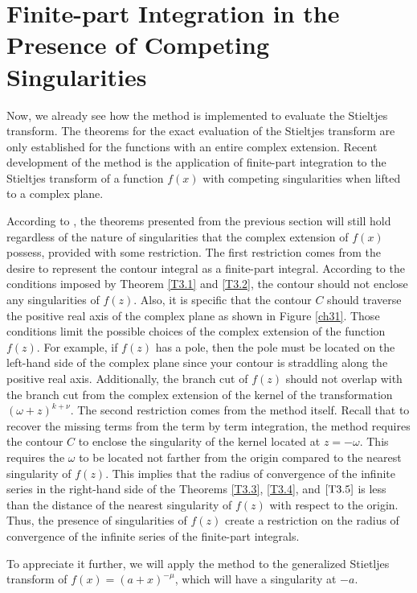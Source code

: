\section{Finite-part Integration in the Presence of Competing Singularities}

Now, we already see how the method is implemented to evaluate the Stieltjes transform. The theorems for the exact evaluation of the Stieltjes transform are only established for the functions with an entire complex extension. Recent development of the method is the application of finite-part integration to the Stieltjes transform of a function $f(x)$ with competing singularities when lifted to a complex plane.

According to \cite{doi:10.1063/5.0038274, lloydthetit}, the theorems presented from the previous section will still hold regardless of the nature of singularities that the complex extension of $f(x)$ possess, provided with some restriction. The first restriction comes from the desire to represent the contour integral as a finite-part integral. According to the conditions imposed by Theorem \ref{T3.1} and \ref{T3.2}, the contour should not enclose any singularities of $f(z)$. Also, it is specific that the contour $C$ should traverse the positive real axis of the complex plane as shown in Figure \ref{ch31}. Those conditions limit the possible choices of the complex extension of the function $f(z)$. For example, if $f(z)$ has a pole, then the pole must be located on the left-hand side of the complex plane since your contour is straddling along the positive real axis. Additionally, the branch cut of $f(z)$ should not overlap with the branch cut from the complex extension of the kernel of the transformation $(\omega + z)^{k+\nu}$. The second restriction comes from the method itself. Recall that to recover the missing terms from the term by term integration, the method requires the contour $C$ to enclose the singularity of the kernel located at $z=-\omega$. This requires the $\omega$ to be located not farther from the origin compared to the nearest singularity of $f(z)$. This implies that the radius of convergence of the infinite series in the right-hand side of the Theorems \ref{T3.3}, \ref{T3.4}, and $\ref{T3.5}$ is less than the distance of the nearest singularity of $f(z)$ with respect to the origin. Thus, the presence of singularities of $f(z)$ create a restriction on the radius of convergence of the infinite series of the finite-part integrals.

To appreciate it further, we will apply the method to the generalized Stietljes transform of $f(x) = (a+x)^{-\mu}$, which will have a singularity at $-a$. 


